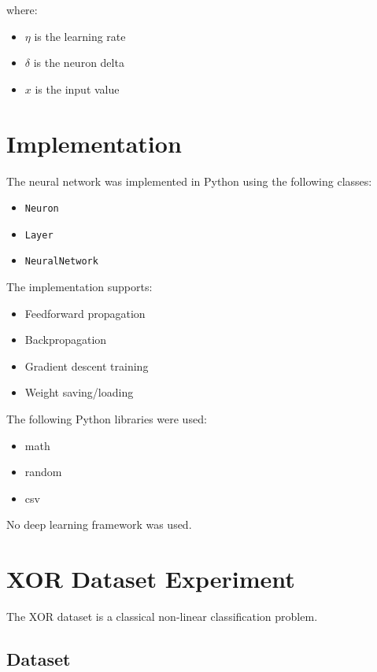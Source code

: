 \documentclass[a4paper,12pt]{article}
\begin{document}
where:
\begin{itemize}
    \item $\eta$ is the learning rate
    \item $\delta$ is the neuron delta
    \item $x$ is the input value
\end{itemize}

\section{Implementation}

The neural network was implemented in Python using the following classes:

\begin{itemize}
    \item \texttt{Neuron}
    \item \texttt{Layer}
    \item \texttt{NeuralNetwork}
\end{itemize}

The implementation supports:
\begin{itemize}
    \item Feedforward propagation
    \item Backpropagation
    \item Gradient descent training
    \item Weight saving/loading
\end{itemize}

The following Python libraries were used:
\begin{itemize}
    \item math
    \item random
    \item csv
\end{itemize}

No deep learning framework was used.

\section{XOR Dataset Experiment}

The XOR dataset is a classical non-linear classification problem.

\subsection{Dataset}
\end{document}
